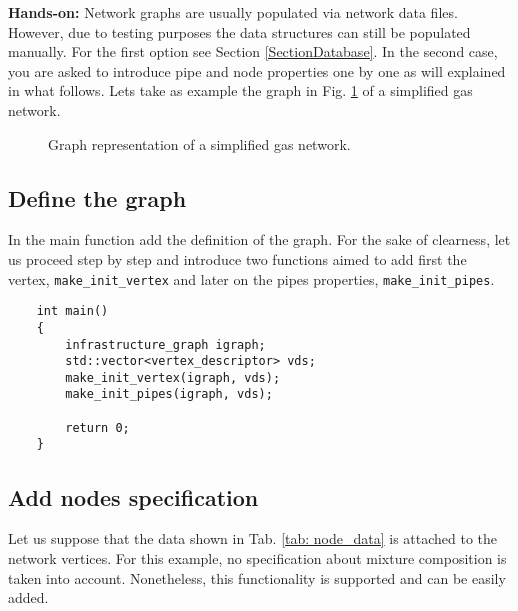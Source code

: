     

\textbf{Hands-on:}
Network graphs are usually populated via network data files. However, due to testing purposes  the data structures can still be populated manually. For the first option see Section \ref{SectionDatabase}. In the second case, you are asked to introduce pipe and node properties one by one as will explained in what follows. Lets take as example the graph in Fig. \ref{fig: graph_example} of a simplified  gas network. 

\begin{figure}[H]
    \centering
                
    \caption{Graph representation of a simplified gas network.}
    \label{fig: graph_example}
\end{figure}

\subsection{Define the graph}
In the main function add the definition of the graph. For the sake of clearness, let us proceed step by step and introduce two functions aimed to add first the vertex, \texttt{make\_init\_vertex} and later on the pipes properties, \texttt{make\_init\_pipes}. 

\begin{verbatim}
    int main()
    {
        infrastructure_graph igraph;
        std::vector<vertex_descriptor> vds;
        make_init_vertex(igraph, vds);
        make_init_pipes(igraph, vds);
    
        return 0; 
    }
\end{verbatim}   


\subsection{Add nodes specification}
Let us suppose that the data shown in Tab. \ref{tab: node_data} is attached to the network vertices. For this example, no specification about mixture composition is  taken into account. Nonetheless, this functionality is supported and can be easily added.

